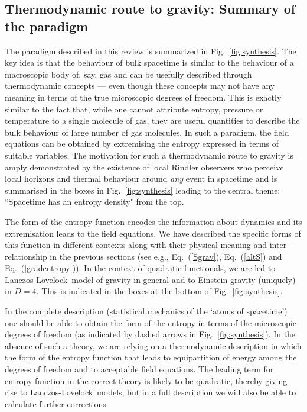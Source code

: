 \documentclass[12pt]{iopart}
\def\eq#1{{Eq.~(\ref{#1})}}
\def\fig#1{{Fig.~\ref{#1}}}
\newcommand{\LL}{Lanczos-Lovelock}
\begin{document}
\subsection{Thermodynamic route to gravity: Summary of the paradigm}

The paradigm described in this review is summarized in \fig{fig:synthesis}. The key idea is that the behaviour of bulk spacetime is similar to the behaviour of a macroscopic body of, say, gas and can be usefully described through thermodynamic concepts --- even though these concepts may not have any meaning in terms of the true microscopic degrees of freedom. This is exactly similar to the fact that, while one cannot  attribute entropy, pressure or temperature to a single molecule of gas, they are useful quantities to describe the bulk behaviour of large number of gas molecules. In such a paradigm, the field equations can be obtained by extremising the entropy expressed in terms of suitable variables. The motivation for such a thermodynamic route to gravity is amply demonstrated by the existence of local Rindler observers who perceive local horizons and thermal behaviour around \textit{any} event in spacetime and is summarised in the boxes in \fig{fig:synthesis} leading to the central theme: ``Spacetime has an entropy density" from the top. 



The form of the entropy function encodes the information about dynamics and its extremisation leads to the field equations. We have described the specific forms of this function in different contexts along with their physical meaning and inter-relationship in the previous sections (see e.g.,  \eq{Sgrav}, \eq{altS} and \eq{gradentropy}). In the context of quadratic functionals, we are led to \LL\ model of gravity in general and  to Einstein gravity (uniquely) in $D=4$. This is indicated in the boxes at the bottom of \fig{fig:synthesis}.

In the complete description (statistical mechanics of the `atoms of spacetime') one should be able to obtain the form of the entropy in terms of the microscopic degrees of freedom (as indicated by dashed arrows in \fig{fig:synthesis}).  In the absence of such a theory, we are relying on a thermodynamic description in which the form of the entropy function that leads \cite{equipartition} to equipartition of energy among the degrees of freedom and to acceptable field equations. The leading term for entropy function in the correct theory is likely to be quadratic, thereby giving rise to \LL\ models, but in a full description we will also be able to calculate further corrections.
\end{document}
